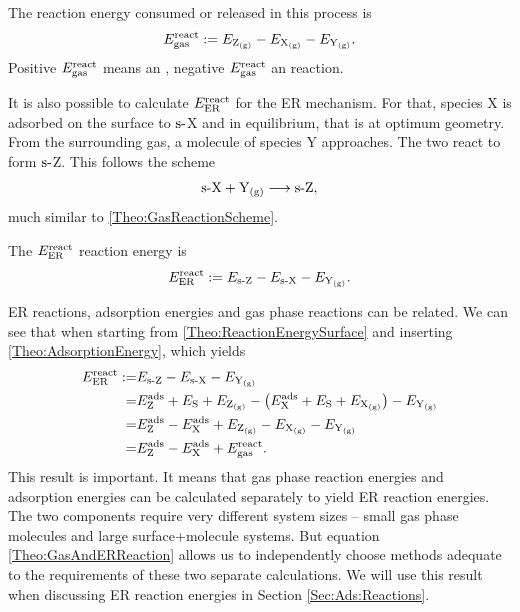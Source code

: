\documentclass[8.5pt,twoside,twocolumn]{article}
\newcommand\eads{\enmat{E^{\te{ads}}}}
\newcommand\ere{\enmat{E^{\te{react}}}}
\newcommand\sur{\enmat{\te{s-}}}
\newcommand\gas{\enmat{_\te{(g)}}}
\theoremstyle{standard}
\begin{document}
The reaction energy consumed or released in this process is
\begin{equation}
 \ere_{\te{gas}}:= E_{\Z\gas} - E_{\X\gas} - E_{\Y\gas}.
 \label{Theo:ReactionEnergyGas}
\end{equation}
Positive $\ere_{\te{gas}}$ means an , negative $\ere_{\te{gas}}$ 
an  reaction.

It is also possible to calculate  $\ere_{\te{ER}}$ for the ER mechanism. For that,
species X is adsorbed on the surface to $\sur$X and in equilibrium, that is at optimum
geometry. From the surrounding gas, a molecule of species Y approaches. The two react
to form $\sur$Z. This follows the scheme
\begin{equation}
 \sur\X+\Y\gas \chemar  \sur\Z,
 \label{Theo:SurfaceReactionScheme}
\end{equation} 
much similar to \eqref{Theo:GasReactionScheme}. 

The $\ere_{\te{ER}}$ reaction energy is
\begin{equation}
 \ere_{\te{ER}}:= E_{\sur\Z} - E_{\sur\X} - E_{\Y\gas}.
 \label{Theo:ReactionEnergySurface}
\end{equation}

ER reactions, adsorption energies and gas phase reactions can be related. We can see
that when starting from \eqref{Theo:ReactionEnergySurface} and inserting
\eqref{Theo:AdsorptionEnergy}, which yields
\begin{equation}
 \begin{aligned}
   \ere_{\te{ER}}:=& E_{\sur\Z} - E_{\sur\X} - E_{\Y\gas}\\
   =& \eads_{\Z}+E_\S + E_{\Z\gas} - \rb{\eads_{\X} +E_\S + E_{\X\gas}} - E_{\Y\gas}\\
   =& \eads_{\Z}-\eads_{\X} + E_{\Z\gas} - E_{\X\gas} - E_{\Y\gas}\\
   =& \eads_{\Z}-\eads_{\X} + \ere_{\te{gas}}.
 \end{aligned}
 \label{Theo:GasAndERReaction}
\end{equation}
This result is important. It means that gas phase reaction energies and
adsorption energies can be calculated separately to yield ER reaction energies.
The two components require very different system sizes -- small gas phase
molecules and large surface+molecule systems. But equation
\eqref{Theo:GasAndERReaction} allows us to independently choose methods
adequate to the requirements of these two separate calculations.
We will use this result when discussing ER reaction energies in Section
\ref{Sec:Ads:Reactions}.
\end{document}
